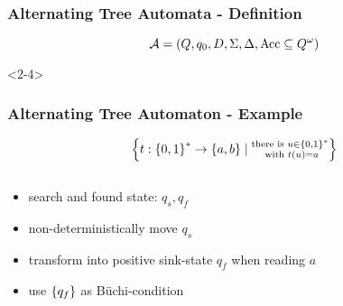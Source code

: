 \documentclass{beamer}
\begin{document}
  \begin{frame}
    \frametitle{Alternating Tree Automata - Definition}
    \begin{overlayarea}{\textwidth}{0.2\textheight}
      \begin{equation*}
        \mathcal{A} = \left(Q, q_{0}, D, \Sigma, \Delta,
          \operatorname{Acc}\subseteq Q^{\omega}\right)
      \end{equation*}
    \end{overlayarea}
    \begin{overlayarea}{\textwidth}{0.5\textheight}
      \begin{onlyenv}<2-4>
        \begin{center}
        \end{center}
      \end{onlyenv}
    \end{overlayarea}
  \end{frame}

  \begin{frame}
    \frametitle{Alternating Tree Automaton - Example}
    \begin{equation*}
      \left\{t:\left\{0,1\right\}^{*}\rightarrow\left\{a,b\right\}\mid\substack{
        \text{there is }u\in\left\{0,1\right\}^{*}\\
        \text{ with }t(u) = a}
      \right\}
    \end{equation*}
    \begin{columns}
      \begin{column}{0.5\textwidth}
        \begin{itemize}
          \item search and found state: $q_{s}, q_{f}$
          \item<2-> non-deterministically move $q_{s}$
          \item<3-> transform into positive sink-state $q_{f}$ when reading $a$
          \item<4-> use $\left\{q_{f}\right\}$ as Büchi-condition
        \end{itemize}
      \end{column}
      \begin{column}{0.5\textwidth}
        \begin{center}
        \end{center}
      \end{column}
    \end{columns}
  \end{frame}
\end{document}
